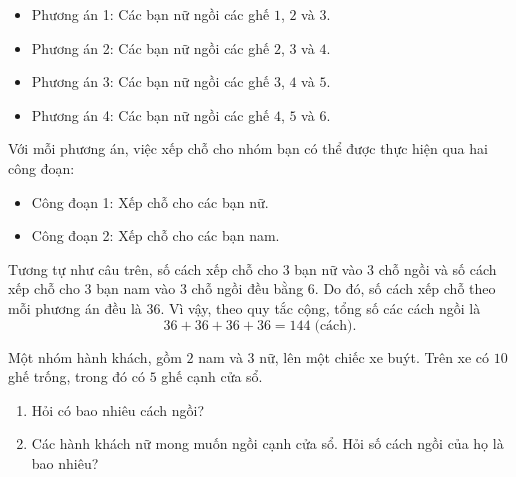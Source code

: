 \begin{bt}
{\begin{enumerate}
			\begin{itemize}
				\item Phương án 1: Các bạn nữ ngồi các ghế $1$, $2$ và $3$.
				\item Phương án 2: Các bạn nữ ngồi các ghế $2$, $3$ và $4$.
				\item Phương án 3: Các bạn nữ ngồi các ghế $3$, $4$ và $5$.
				\item Phương án 4: Các bạn nữ ngồi các ghế $4$, $5$ và $6$.
			\end{itemize}
			Với mỗi phương án, việc xếp chỗ cho nhóm bạn có thể được thực hiện qua hai công đoạn:
			\begin{itemize}
				\item Công đoạn 1: Xếp chỗ cho các bạn nữ.
				\item Công đoạn 2: Xếp chỗ cho các bạn nam.
			\end{itemize}
			Tương tự như câu trên, số cách xếp chỗ cho $3$ bạn nữ vào $3$ chỗ ngồi và số cách xếp chỗ cho $3$ bạn nam vào $3$ chỗ ngồi đều bằng $6$. Do đó, số cách xếp chỗ theo mỗi phương án đều là $36$. Vì vậy, theo quy tắc cộng, tổng số các cách ngồi là
			$$36+36+36+36=144\;\text{(cách)}.$$
		\end{enumerate}
	}
\end{bt}

\begin{bt}%
	Một nhóm hành khách, gồm $2$ nam và $3$ nữ, lên một chiếc xe buýt. Trên xe có $10$ ghế trống, trong đó có $5$ ghế cạnh cửa sổ.
	\begin{enumerate}
		\item Hỏi có bao nhiêu cách ngồi?
		\item Các hành khách nữ mong muốn ngồi cạnh cửa sổ. Hỏi số cách ngồi của họ là bao nhiêu?
	\end{enumerate}
\end{bt}

